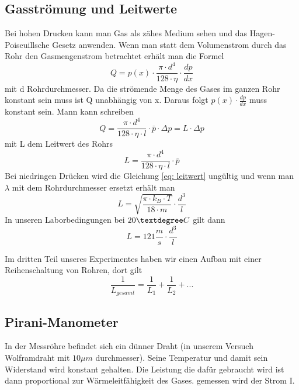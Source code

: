\documentclass[12pt]{article}
\begin{document}
	\subsection{Gasströmung und Leitwerte}
	Bei hohen Drucken kann  man Gas als zähes Medium sehen und das Hagen-Poiseuillsche Gesetz anwenden. Wenn man statt dem Volumenstrom durch das Rohr den Gasmengenstrom betrachtet erhält man die Formel
	\begin{equation}
		Q= p(x) \cdot \frac{\pi \cdot d^4}{128 \cdot \eta }\cdot \frac{dp}{dx}
	\end{equation}
	mit d Rohrdurchmesser.
	Da die strömende Menge des Gases im ganzen Rohr konstant sein muss ist Q unabhängig von x. Daraus folgt $p(x)\cdot \frac{dp}{dx}$ muss konstant sein. Mann kann schreiben
	\begin{equation}
		Q=\frac{\pi \cdot d^4}{128 \cdot \eta \cdot l }\cdot \bar{p}\cdot \Delta p = L\cdot \Delta p
	\end{equation}
	mit L dem Leitwert des Rohrs
	\begin{equation}\label{eq: leitwert}
		L=\frac{\pi \cdot d^4}{128 \cdot \eta \cdot l }\cdot \bar{p}
	\end{equation}
	Bei niedringen Drücken wird die Gleichung \ref{eq: leitwert} ungültig und wenn man $\lambda$ mit dem Rohrdurchmesser ersetzt erhält man
	\begin{equation}
		L=\sqrt{\frac{\pi \cdot k_B \cdot T}{18 \cdot m}}\cdot \frac{d^3}{l}
	\end{equation}
	In unseren Laborbedingungen bei $20\textdegree C$ gilt dann
	\begin{equation}\label{eq: mol strom}
		L= 121 \frac{m}{s}\cdot \frac{d^3}{l}
	\end{equation}

	Im dritten Teil unseres Experimentes haben wir einen Aufbau mit einer Reihenschaltung  von Rohren, dort gilt 
	\begin{equation}\label{eq: eff saugen}
		\frac{1}{L_{gesamt}}=\frac{1}{L_1}+\frac{1}{L_2}+...
	\end{equation}	
	\subsection{Pirani-Manometer}
	In der Messröhre befindet sich ein dünner Draht (in unserem Versuch Wolframdraht mit $10 \mu m$ durchmesser). Seine Temperatur und damit sein Widerstand wird konstant gehalten. Die Leistung die dafür gebraucht wird ist dann proportional zur Wärmeleitfähigkeit des Gases. gemessen wird der Strom I.
	
\end{document}

